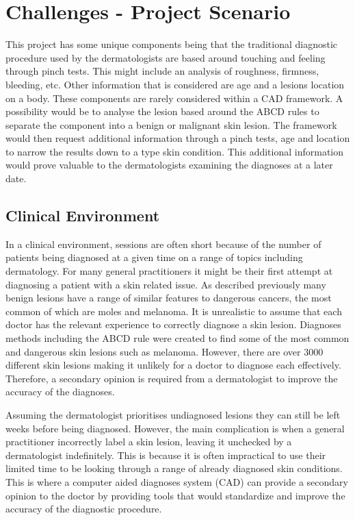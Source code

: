 \documentclass[12pt]{report}
\begin{document}
\section{Challenges - Project Scenario}
This project has some unique components being that the traditional diagnostic procedure used by the dermatologists are based around touching and feeling through pinch tests. This might include an analysis of roughness, firmness, bleeding, etc. Other information that is considered are age and a lesions location on a body. These components are rarely considered within a CAD framework. A possibility would be to analyse the lesion based around the ABCD rules to separate the component into a benign or malignant skin lesion. The framework would then request additional information through a pinch tests, age and location to narrow the results down to a type skin condition. This additional information would prove valuable to the dermatologists examining the diagnoses at a later date.
\subsection{Clinical Environment}
In a clinical environment, sessions are often short because of the number of patients being diagnosed at a given time on a range of topics including dermatology. For many general practitioners it might be their first attempt at diagnosing a patient with a skin related issue. As described previously many benign lesions have a range of similar features to dangerous cancers, the most common of which are moles and melanoma. It is unrealistic to assume that each doctor has the relevant experience to correctly diagnose a skin lesion. Diagnoses methods including the ABCD rule were created to find some of the most common and dangerous skin lesions such as melanoma. However, there are over 3000 different skin lesions making it unlikely for a doctor to diagnose each effectively. Therefore, a secondary opinion is required from a dermatologist to improve the accuracy of the diagnoses.

Assuming the dermatologist prioritises undiagnosed lesions they can still be left weeks before being diagnosed. However, the main complication is when a general practitioner incorrectly label a skin lesion, leaving it unchecked by a dermatologist indefinitely. This is because it is often impractical to use their limited time to be looking through a range of already diagnosed skin conditions. This is where a computer aided diagnoses system (CAD) can provide a secondary opinion to the doctor by providing tools that would standardize and improve the accuracy of the diagnostic procedure.
\end{document}
